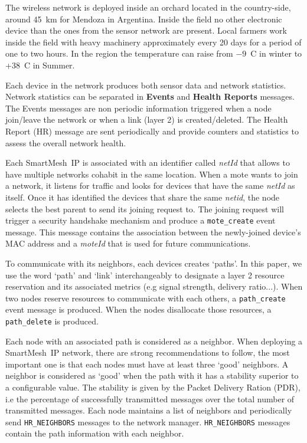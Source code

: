 \documentclass{sig-alternate}
\newcommand{\smip}           {SmartMesh~IP\xspace}
\newcommand{\HRNEIGHBORS}    {{\tt HR\_NEIGHBORS}\xspace}
\newcommand{\pathcreate}     {{\tt path\_create}\xspace}
\newcommand{\pathdelete}     {{\tt path\_delete}\xspace}
\newcommand{\motecreate}     {{\tt mote\_create}\xspace}
\begin{document}

The wireless network is deployed inside an orchard located in the country-side, around 45~km for Mendoza in Argentina.
Inside the field no other electronic device than the ones from the sensor network are present.
Local farmers work inside the field with heavy machinery approximately every 20 days for a period of one to two hours.
In the region the temperature can raise from $-9$~C in winter to +38~C in Summer.


Each device in the network produces both sensor data and network statistics.
Network statistics can be separated in \textbf{Events} and \textbf{Health Reports} messages.
The Events messages are non periodic information triggered when a node join/leave the network or when a link (layer 2) is created/deleted.
The Health Report (HR) message are sent periodically and provide counters and statistics to assess the overall network health.


Each \smip is associated with an identifier called \textit{netId} that allows to have multiple networks cohabit in the same location.
When a mote wants to join a network, it listens for traffic and looks for devices that have the same \textit{netId} as itself.
Once it has identified the devices that share the same \textit{netid}, the node selects the best parent to send its joining request to.
The joining request will trigger a security handshake mechanism and produce a \motecreate event message.
This message contains the association between the newly-joined device's MAC address and a \textit{moteId} that is used for future communications.


To communicate with its neighbors, each devices creates `paths'.
In this paper, we use the word `path' and `link' interchangeably to designate a layer 2 resource reservation and its associated metrics (e.g signal strength, delivery ratio...).
When two nodes reserve resources to communicate with each others, a \pathcreate event message is produced.
When the nodes disallocate those resources, a \pathdelete is produced.


Each node with an associated path is considered as a neighbor.
When deploying a \smip network, there are strong recommendations to follow, the most important one is that each nodes must have at least three `good' neighbors.
A neighbor is considered as `good' when the path with it has a stability superior to a configurable value.
The stability is given by the Packet Delivery Ration (PDR), i.e the percentage of successfully transmitted messages over the total number of transmitted messages.
Each node maintains a list of neighbors and periodically send \HRNEIGHBORS messages to the network manager.
\HRNEIGHBORS messages contain the path information with each neighbor.
\end{document}
